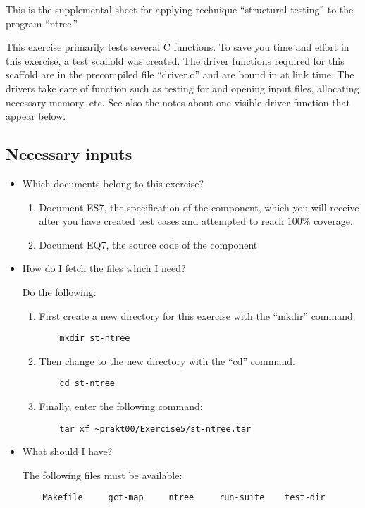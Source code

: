 
This is the supplemental sheet 
for applying technique ``structural testing''
to the program ``ntree.'' 

\bigskip

This exercise primarily tests several C functions.
To save you time and effort in this exercise, a test scaffold was
created. 
The driver functions required for this scaffold are in the precompiled
file ``driver.o'' and are bound in at link time.
The drivers take care of function such as testing for and opening
input files, allocating necessary memory, etc.  See also the notes
about one visible driver function that appear below.

\subsection*{Necessary inputs}

\begin{itemize}

\item Which documents belong to this exercise?

\begin{enumerate}
\item Document ES7, the specification of the component, which you will
receive after you have created test cases and attempted to reach 100\%
coverage.
\item Document EQ7, the source code of the component
\end{enumerate}

\item How do I fetch the files which I need?

Do the following:

\begin{enumerate}

\item First create a new directory for this exercise with the
``mkdir'' command.
\begin{verbatim}
    mkdir st-ntree
\end{verbatim}

\item Then change to the new directory with the ``cd'' command.
\begin{verbatim}
    cd st-ntree
\end{verbatim}

\item Finally, enter the following command:
\begin{path}
\begin{verbatim}
    tar xf ~prakt00/Exercise5/st-ntree.tar
\end{verbatim}
\end{path}

\end{enumerate}

\item What should I have?

The following files must be available:
\begin{verbatim}
    Makefile     gct-map     ntree     run-suite    test-dir
\end{verbatim}

\end{itemize}


